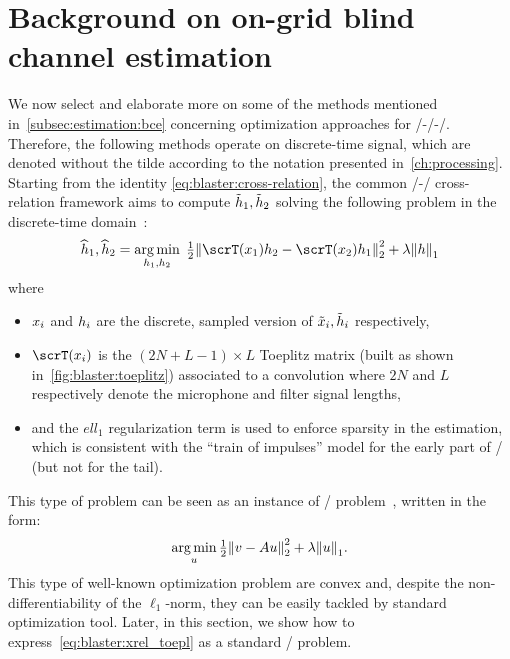 \section{Background on on-grid blind channel estimation}\label{sec:blaster:background}
We now select and elaborate more on some of the methods mentioned in~\cref{subsec:estimation:bce} concerning optimization approaches for \FIR/-\SIMO/-\BCE/.
Therefore, the following methods operate on discrete-time signal, which are denoted without the tilde according to the notation presented in~\cref{ch:processing}.
Starting from the identity \cref{eq:blaster:cross-relation}, the common \SIMO/-\BCE/ cross-relation framework aims to compute $\tilde{h}_1, \tilde{h}_2$ solving the following problem in the discrete-time domain~:
\begin{equation}
    \label{eq:blaster:xrel_toepl}
    \disFilterHat_1, \disFilterHat_2
    =
    \kargmin_{\disFilter_1, \disFilter_2}
    \;
    \tfrac{1}{2}
    \kvvbar{
        \scrT(\disRecordedSignal_1) \disFilter_2
        -
        \scrT(\disRecordedSignal_2) \disFilter_1
    }_2^2
    +
    \lambda
    \kvvbar{
        \disFilter
    }_1
\end{equation}
where
\begin{itemize}
    \item  $x_i$ and $h_i$ are the discrete, sampled version of $\tilde{x}_i, \tilde{h}_i$ respectively,
    \item $\scrT(\disRecordedSignal_i)$ is the $(2N+L-1) \times L$ Toeplitz matrix (built as shown in~\cref{fig:blaster:toeplitz})
    associated to a convolution where $2N$ and $L$ respectively denote the microphone and filter signal lengths,
    \item and the $ell_1$ regularization term is used to enforce sparsity in the estimation, which is consistent with the ``train of impulses'' model for the early part of \RIRs/ (but not for the tail).
\end{itemize}
This type of problem can be seen as an instance of \LASSO/ problem~, written in the form:
\begin{equation}\label{eq:blaster:lasso}
    \kargmin_{u} \tfrac{1}{2} \kvvbar{v - Au}_2^2 + \lambda\kvvbar{u}_1
    .
\end{equation}
This type of well-known optimization problem are convex and, despite the non-differentiability of the $\ell_1$-norm, they can be easily tackled by standard optimization tool.
Later, in this section, we show how to express~\cref{eq:blaster:xrel_toepl} as a standard \LASSO/ problem.

